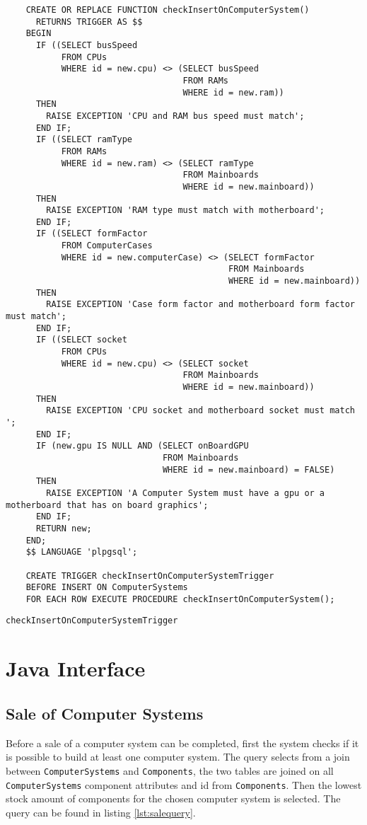 \documentclass[12pt,a4paper]{article}
\begin{document}
\begin{listing}[!htbp]
	\begin{verbatim}
	CREATE OR REPLACE FUNCTION checkInsertOnComputerSystem()
	  RETURNS TRIGGER AS $$
	BEGIN
	  IF ((SELECT busSpeed
	       FROM CPUs
	       WHERE id = new.cpu) <> (SELECT busSpeed
	                               FROM RAMs
	                               WHERE id = new.ram))
	  THEN
	    RAISE EXCEPTION 'CPU and RAM bus speed must match';
	  END IF;
	  IF ((SELECT ramType
	       FROM RAMs
	       WHERE id = new.ram) <> (SELECT ramType
	                               FROM Mainboards
	                               WHERE id = new.mainboard))
	  THEN
	    RAISE EXCEPTION 'RAM type must match with motherboard';
	  END IF;
	  IF ((SELECT formFactor
	       FROM ComputerCases
	       WHERE id = new.computerCase) <> (SELECT formFactor
	                                        FROM Mainboards
	                                        WHERE id = new.mainboard))
	  THEN
	    RAISE EXCEPTION 'Case form factor and motherboard form factor must match';
	  END IF;
	  IF ((SELECT socket
	       FROM CPUs
	       WHERE id = new.cpu) <> (SELECT socket
	                               FROM Mainboards
	                               WHERE id = new.mainboard))
	  THEN
	    RAISE EXCEPTION 'CPU socket and motherboard socket must match ';
	  END IF;
	  IF (new.gpu IS NULL AND (SELECT onBoardGPU
	                           FROM Mainboards
	                           WHERE id = new.mainboard) = FALSE)
	  THEN
	    RAISE EXCEPTION 'A Computer System must have a gpu or a motherboard that has on board graphics';
	  END IF;
	  RETURN new;
	END;
	$$ LANGUAGE 'plpgsql';

	CREATE TRIGGER checkInsertOnComputerSystemTrigger
	BEFORE INSERT ON ComputerSystems
	FOR EACH ROW EXECUTE PROCEDURE checkInsertOnComputerSystem();
	\end{verbatim}
	\caption{\texttt{checkInsertOnComputerSystemTrigger}}
	\label{lst:trigger}
\end{listing}

\section{Java Interface}

\subsection{Sale of Computer Systems}
Before a sale of a computer system can be completed, first the system checks if it is possible to build at least one computer system. 
The query selects from a join between \texttt{ComputerSystems} and \texttt{Components}, the two tables are joined on all \texttt{ComputerSystems} component attributes and id from \texttt{Components}. 
Then the lowest stock amount of components for the chosen computer system is selected. 
The query can be found in listing \ref{lst:salequery}.
\end{document}
